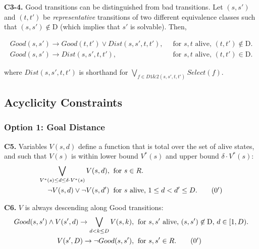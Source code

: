 \documentclass[a4paper]{article}
\newcommand{\smallpar}[1]{{\vspace{10pt}\noindent \bf #1.}}
\newcommand{\badtx}{\ensuremath{\mathrm{D}}}
\begin{document}
\smallpar{C3-4}
Good transitions can be distinguished from bad transitions.
Let $(s, s')$ and $(t, t')$ be \emph{representative} transitions
of two different equivalence classes such that $(s, s') \not\in \badtx$
(which implies that $s'$ is solvable). Then,

\begin{align}
 Good(s, s') \rightarrow Good(t, t') \lor
 Dist(s, s', t, t'),&\;\; \text{for $s, t$ alive, $(t, t') \not\in \badtx$.} \\
 Good(s, s') \rightarrow
 Dist(s, s', t, t'),&\;\; \text{for $s, t$ alive, $(t, t') \in \badtx$.}
\end{align}

\noindent where $Dist(s, s', t, t')$ is shorthand for $\bigvee_{f \in D1\&2(s, s', t, t')} Select(f)$.

\subsection{Acyclicity Constraints}

\subsubsection{Option 1: Goal Distance}


\smallpar{C5}
Variables $V(s, d)$ define a function that is total over the set of alive states,
and such that $V(s)$ is within lower bound $V^*(s)$ and upper bound $\delta \cdot V^*(s)$:
\begin{align}
 \bigvee_{V^*(s) \leq d \leq \delta \cdot V^*(s)} V(s,d),&\;\; \text{for $s \in R$.} \\
 \neg V(s, d) \lor \neg V(s, d')&\;\; \text{for $s$ alive, $1 \leq d < d' \leq D$.} \tag{\theequation${}^\prime$}
\end{align}


\smallpar{C6}
$V$ is always descending along Good transitions:
\begin{align}
 Good(s, s') \land V(s', d) \rightarrow \bigvee_{d < k \leq D} V(s, k),&\;\; \text{for $s, s'$ alive, $(s, s') \not\in \badtx$, $d \in [1, D)$.} \\
 V(s', D) \rightarrow \neg Good(s, s'),&\;\; \text{for $s, s' \in R$.} \tag{\theequation${}^\prime$}
\end{align}


\end{document}
